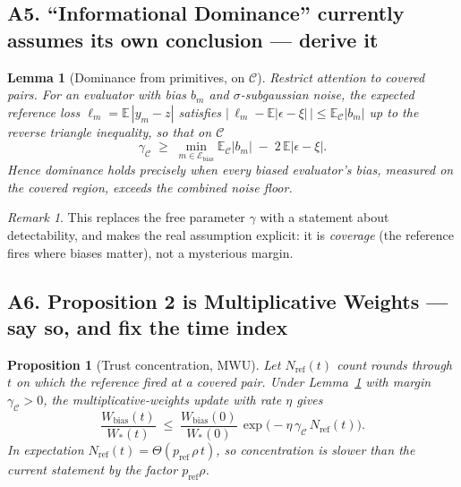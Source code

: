 \documentclass[11pt]{article}
\newtheorem{proposition}{Proposition}
\newtheorem{lemma}{Lemma}
\theoremstyle{definition}
\theoremstyle{remark}
\newtheorem{remark}{Remark}
\newcommand{\Ebias}{\mathcal{E}_{\mathrm{bias}}}
\newcommand{\Cov}{\mathcal{C}}
\newcommand{\E}{\mathbb{E}}
\begin{document}
\subsection*{A5. ``Informational Dominance'' currently assumes its own conclusion --- derive it}

\begin{lemma}[Dominance from primitives, on $\Cov$]
\label{lem:dominance}
Restrict attention to covered pairs. For an evaluator with bias $b_m$ and $\sigma$-subgaussian
noise, the expected reference loss $\ell_m=\E\,|y_m-z|$ satisfies
$\big|\,\ell_m-\E|\epsilon-\xi|\,\big|\le \E_{\Cov}|b_m|$ up to the reverse triangle inequality,
so that on $\Cov$
\[
\gamma_{\Cov} \;\ge\; \min_{m\in\Ebias}\E_{\Cov}|b_m| \;-\; 2\,\E|\epsilon-\xi| .
\]
Hence \emph{dominance holds precisely when every biased evaluator's bias, measured on the covered
region, exceeds the combined noise floor.}
\end{lemma}

\begin{remark}
This replaces the free parameter $\gamma$ with a statement about detectability, and makes the
real assumption explicit: it is \emph{coverage} (the reference fires where biases matter), not a
mysterious margin.
\end{remark}

\subsection*{A6. Proposition 2 is Multiplicative Weights --- say so, and fix the time index}

\begin{proposition}[Trust concentration, MWU]
\label{prop:mwu}
Let $N_{\mathrm{ref}}(t)$ count rounds through $t$ on which the reference fired at a covered pair.
Under Lemma~\ref{lem:dominance} with margin $\gamma_{\Cov}>0$, the multiplicative-weights update
with rate $\eta$ gives
\[
\frac{W_{\mathrm{bias}}(t)}{W_{\ast}(t)}\;\le\;\frac{W_{\mathrm{bias}}(0)}{W_{\ast}(0)}\,
\exp\!\big(-\eta\,\gamma_{\Cov}\,N_{\mathrm{ref}}(t)\big).
\]
In expectation $N_{\mathrm{ref}}(t)=\Theta(p_{\mathrm{ref}}\,\rho\, t)$, so concentration is
slower than the current statement by the factor $p_{\mathrm{ref}}\rho$.
\end{proposition}
\end{document}
